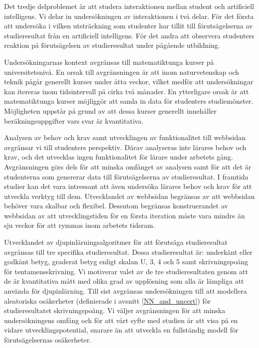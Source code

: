 Det tredje delproblemet är att studera interaktionen mellan student och artificiell intelligens. Vi delar in undersökningen av interaktionen i två delar. För det första att undersöka i vilken utsträckning som studenter har tillit till förutsägelserna av studieresultat från en artificiell intelligens. För det andra att observera studenters reaktion på förutsägelsen av studieresultat under pågående utbildning. 

Undersökningarnas kontext avgränsas till matematiktunga kurser på universitetsnivå. En orsak till avgränsningen är att inom naturvetenskap och teknik pågår generellt kurser under åtta veckor, vilket medför att undersökningar kan itereras inom tidsintervall på cirka två månader. En ytterligare orsak är att matematiktunga kurser möjliggör att samla in data för studenters studiemönster. Möjligheten uppstår på grund av att dessa kurser generellt innehåller beräkningsuppgifter vars svar är kvantitativa.

Analysen av behov och krav samt utvecklingen av funktionalitet till webbsidan avgränsar vi till studenters perspektiv. Därav analyseras inte lärares behov och krav, och det utvecklas ingen funktionalitet för lärare under arbetets gång. Avgränsningen görs dels för att minska omfånget av analysen samt för att det är studenterna som genererar data till förutsägelserna av studieresultat. I framtida studier kan det vara intressant att även undersöka lärares behov och krav för att utveckla verktyg till dem. Utvecklandet av webbsidan begränsas av att webbsidan behöver vara skalbar och flexibel. Dessutom begränsas konstruerandet av webbsidan av att utvecklingstiden för en första iteration måste vara mindre än sju veckor för att rymmas inom arbetets tidsram.

Utvecklandet av djupinlärningsalgoritmer för att förutsäga studieresultat avgränsas till tre specifika studieresultat. Dessa studieresultat är: underkänt eller godkänt betyg, graderat betyg enligt skalan U, 3, 4 och 5 samt skrivningspoäng för tentamensskrivning. Vi motiverar valet av de tre studieresultaten genom att de är kvantitativa mått med olika grad av upplösning som alla är lämpliga att använda för djupinlärning. Till sist avgränsas undersökningen till att modellera aleatoriska osäkerheter (definierade i avsnitt \ref{NN_and_uncert}) för studieresultatet skrivningspoäng. Vi väljer avgränsningen för att minska undersökningens omfång och för att vårt syfte med studien är att visa på en vidare utvecklingspotential, snarare än att utveckla en fullständig modell för förutsägelsernas osäkerheter.

